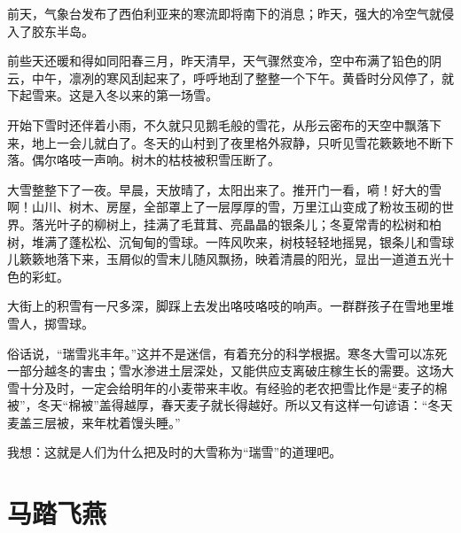 \documentclass[12pt,UTF-8,openany]{ctexbook}
\begin{document}
\begin{large}
    
    前天，气象台发布了西伯利亚来的寒流即将南下的消息；昨天，强大的冷空气就侵入了胶东半岛。
    
    前些天还暖和得如同阳春三月，昨天清早，天气骤然变冷，空中布满了铅色的阴云，中午，凛冽的寒风刮起来了，呼呼地刮了整整一个下午。黄昏时分风停了，就下起雪来。这是入冬以来的第一场雪。
    
    开始下雪时还伴着小雨，不久就只见鹅毛般的雪花，从彤云密布的天空中飘落下来，地上一会儿就白了。冬天的山村到了夜里格外寂静，只听见雪花簌簌地不断下落。偶尔咯吱一声响。树木的枯枝被积雪压断了。
    
    大雪整整下了一夜。早晨，天放晴了，太阳出来了。推开门一看，嗬！好大的雪啊！山川、树木、房屋，全部罩上了一层厚厚的雪，万里江山变成了粉妆玉砌的世界。落光叶子的柳树上，挂满了毛茸茸、亮晶晶的银条儿；冬夏常青的松树和柏树，堆满了蓬松松、沉甸甸的雪球。一阵风吹来，树枝轻轻地摇晃，银条儿和雪球儿簌簌地落下来，玉屑似的雪末儿随风飘扬，映着清晨的阳光，显出一道道五光十色的彩虹。
    
    大街上的积雪有一尺多深，脚踩上去发出咯吱咯吱的响声。一群群孩子在雪地里堆雪人，掷雪球。
    
    俗话说，“瑞雪兆丰年。”这并不是迷信，有着充分的科学根据。寒冬大雪可以冻死一部分越冬的害虫；雪水渗进土层深处，又能供应支离破庄稼生长的需要。这场大雪十分及时，一定会给明年的小麦带来丰收。有经验的老农把雪比作是“麦子的棉被”，冬天“棉被”盖得越厚，春天麦子就长得越好。所以又有这样一句谚语：“冬天麦盖三层被，来年枕着馒头睡。”
    
    我想：这就是人们为什么把及时的大雪称为“瑞雪”的道理吧。
    
\end{large}



\chapter{马踏飞燕}
\end{document}
